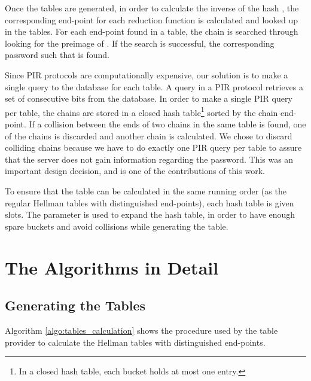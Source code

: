 \documentclass{llncs}
\begin{document}
Once the tables are generated, in order to calculate the inverse of
the hash , the corresponding end-point for each reduction function
 is calculated and looked up in the tables. For each end-point
found in a table, the chain is searched through looking for the preimage of
. If the search is successful, the corresponding password 
 such that  is found.

Since PIR protocols are computationally expensive,
our solution is to make a single query to the database for each table. 
A query in a PIR protocol retrieves a set of consecutive bits
from the database. In order to make a single PIR query per table,
the chains are stored in a closed hash table\footnote{In a closed hash table,
each bucket holds at most one entry.}
sorted by the chain end-point.
If a collision between the ends of two chains in the same table
is found, one of the chains is discarded and
another chain is calculated.
We chose to discard colliding chains because
we have to do exactly one PIR query per table to assure
that the server does not gain information regarding the password.
This was an important design decision, and is one of the contributions
of this work.

To ensure that the table can be calculated
in the same running order (as the regular Hellman tables with distinguished
end-points), each hash table is given  slots.
The parameter  is used to expand the hash table,
in order to have enough spare buckets and avoid collisions while generating the table.


\section{The Algorithms in Detail} \label{sec:algorithms-detail}


\subsection{Generating the Tables} \label{sec:hash-reversing}

Algorithm \ref{algo:tables_calculation} shows
the procedure used by the table provider to calculate the Hellman
tables with distinguished end-points.
\end{document}
